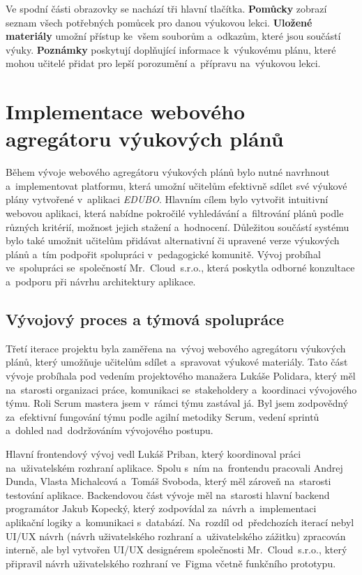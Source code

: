 \documentclass[male,czech,api_bc]{kitheses}
\begin{document}
Ve spodní části obrazovky se nachází tři hlavní tlačítka. \textbf{Pomůcky} zobrazí seznam všech potřebných pomůcek pro danou výukovou lekci. \textbf{Uložené materiály} umožní přístup ke~všem souborům a~odkazům, které jsou součástí výuky. \textbf{Poznámky} poskytují doplňující informace k~výukovému plánu, které mohou učitelé přidat pro lepší porozumění a~přípravu na~výukovou lekci.


\section{Implementace webového agregátoru výukových plánů}

Během vývoje webového agregátoru výukových plánů bylo nutné navrhnout a~implementovat platformu, která umožní učitelům efektivně sdílet své výukové plány vytvořené v~aplikaci \textit{EDUBO}. Hlavním cílem bylo vytvořit intuitivní webovou aplikaci, která nabídne pokročilé vyhledávání a~filtrování plánů podle různých kritérií, možnost jejich stažení a~hodnocení. Důležitou součástí systému bylo také umožnit učitelům přidávat alternativní či upravené verze výukových plánů a~tím podpořit spolupráci v~pedagogické komunitě. Vývoj probíhal ve~spolupráci se~společností Mr.~Cloud~s.r.o., která poskytla odborné konzultace a~podporu při návrhu architektury aplikace.

\subsection{Vývojový proces a týmová spolupráce}

Třetí iterace projektu byla zaměřena na~vývoj webového agregátoru výukových plánů, který umožňuje učitelům sdílet a~spravovat výukové materiály. Tato část vývoje probíhala pod vedením projektového manažera Lukáše Polidara, který měl na~starosti organizaci práce, komunikaci se~stakeholdery a~koordinaci vývojového týmu. Roli Scrum mastera jsem v~rámci týmu zastával já. Byl jsem zodpovědný za~efektivní fungování týmu podle agilní metodiky Scrum, vedení sprintů a~dohled nad~dodržováním vývojového postupu.

Hlavní frontendový vývoj vedl Lukáš Priban, který koordinoval práci na~uživatelském rozhraní aplikace. Spolu s~ním na~frontendu pracovali Andrej Dunda, Vlasta Michalcová a~Tomáš Svoboda, který měl zároveň na~starosti testování aplikace. Backendovou část vývoje měl na~starosti hlavní backend programátor Jakub Kopecký, který zodpovídal za~návrh a~implementaci aplikační logiky a~komunikaci s~databází. Na~rozdíl od~předchozích iterací nebyl UI/UX návrh (návrh uživatelského rozhraní a~uživatelského zážitku) zpracován interně, ale byl vytvořen UI/UX designérem společnosti Mr.~Cloud~s.r.o., který připravil návrh uživatelského rozhraní ve~Figma včetně funkčního prototypu.
\end{document}

